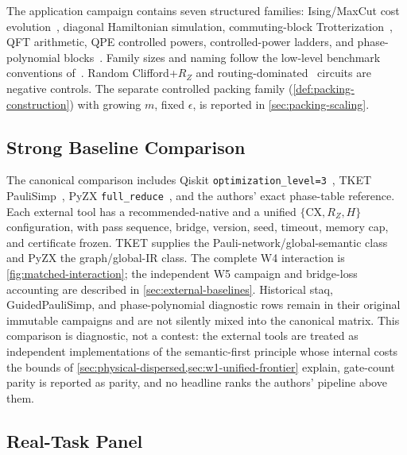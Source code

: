 \documentclass[a4paper,twocolumn,10pt,unpublished]{quantumarticle}
\begin{document}
The application campaign contains seven structured families: Ising/MaxCut
cost evolution~\cite{farhi2014qaoa}, diagonal Hamiltonian simulation,
commuting-block Trotterization~\cite{childs2021trotter}, QFT arithmetic,
QPE controlled powers, controlled-power
ladders, and phase-polynomial blocks~\cite{amy2019cnot}.  Family sizes and
naming follow the low-level benchmark
conventions of~\cite{li2023qasmbench,quetschlich2023mqt}.  Random
Clifford+$R_Z$ and
routing-dominated~\cite{cowtan2019routing,li2019sabre} circuits are
negative controls.  The separate controlled
packing family
(\cref{def:packing-construction}) with growing $m$, fixed $\epsilon$,
is reported in \cref{sec:packing-scaling}.

\subsection{Strong Baseline Comparison}

The canonical comparison includes Qiskit
\texttt{optimization\_level=3}~\cite{javadi2024qiskit}, TKET
PauliSimp~\cite{sivarajah2021tket,cowtan2020phase}, PyZX
\texttt{full\_reduce}~\cite{kissinger2020pyzx}, and the authors' exact
phase-table reference.  Each external tool has a recommended-native and a
unified $\{\mathrm{CX},R_Z,H\}$ configuration, with pass sequence, bridge,
version, seed, timeout, memory cap, and certificate frozen.  TKET supplies the
Pauli-network/global-semantic class and PyZX the graph/global-IR class.  The
complete W4 interaction is \cref{fig:matched-interaction}; the independent W5
campaign and bridge-loss accounting are described in
\cref{sec:external-baselines}.  Historical staq, GuidedPauliSimp, and
phase-polynomial diagnostic rows remain in their original immutable campaigns
and are not silently mixed into the canonical matrix.  This comparison is
diagnostic, not a contest: the external tools are treated as independent
implementations of the semantic-first principle whose internal costs the
bounds of \cref{sec:physical-dispersed,sec:w1-unified-frontier} explain,
gate-count parity is reported as parity, and no headline ranks the
authors' pipeline above them.

\subsection{Real-Task Panel}
\end{document}
